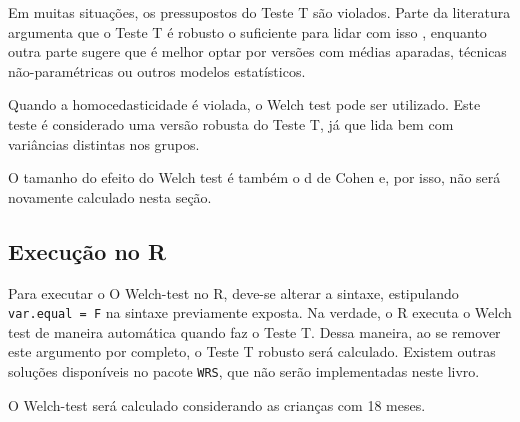 \documentclass[
]{book}
\newenvironment{Shaded}{\begin{snugshade}}{\end{snugshade}}
\newcommand{\DataTypeTok}[1]{\textcolor[rgb]{0.13,0.29,0.53}{#1}}
\newcommand{\DecValTok}[1]{\textcolor[rgb]{0.00,0.00,0.81}{#1}}
\newcommand{\KeywordTok}[1]{\textcolor[rgb]{0.13,0.29,0.53}{\textbf{#1}}}
\newcommand{\NormalTok}[1]{#1}
\newcommand{\OperatorTok}[1]{\textcolor[rgb]{0.81,0.36,0.00}{\textbf{#1}}}
\newcommand{\OtherTok}[1]{\textcolor[rgb]{0.56,0.35,0.01}{#1}}
\newcommand{\StringTok}[1]{\textcolor[rgb]{0.31,0.60,0.02}{#1}}
\begin{document}
Em muitas situações, os pressupostos do Teste T são violados. Parte da literatura argumenta que o Teste T é robusto o suficiente para lidar com isso \citep{Lumley2002}, enquanto outra parte sugere que é melhor optar por versões com médias aparadas, técnicas não-paramétricas \citep{Field2017} ou outros modelos estatísticos.

Quando a homocedasticidade é violada, o Welch test pode ser utilizado. Este teste é considerado uma versão robusta do Teste T, já que lida bem com variâncias distintas nos grupos.

O tamanho do efeito do Welch test é também o d de Cohen e, por isso, não será novamente calculado nesta seção.

\hypertarget{execuuxe7uxe3o-no-r-3}{%
\subsection{Execução no R}\label{execuuxe7uxe3o-no-r-3}}

Para executar o O Welch-test no R, deve-se alterar a sintaxe, estipulando \texttt{var.equal\ =\ F} na sintaxe previamente exposta. Na verdade, o R executa o Welch test de maneira automática quando faz o Teste T. Dessa maneira, ao se remover este argumento por completo, o Teste T robusto será calculado. Existem outras soluções disponíveis no pacote \texttt{WRS}, que não serão implementadas neste livro.

O Welch-test será calculado considerando as crianças com 18 meses.

\begin{Shaded}
\end{Shaded}
\end{document}

